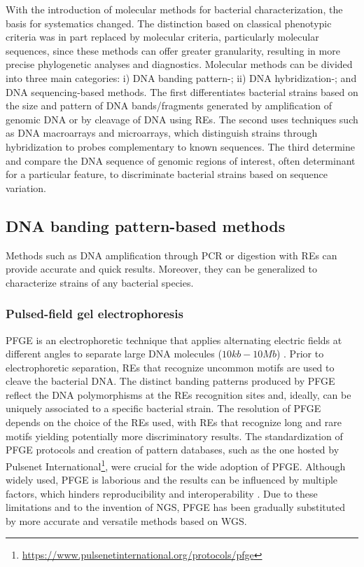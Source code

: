 With the introduction of molecular methods for bacterial characterization, the basis for systematics changed. The distinction based on classical phenotypic criteria was in part replaced by molecular criteria, particularly molecular sequences, since these methods can offer greater granularity, resulting in more precise phylogenetic analyses and diagnostics. Molecular methods can be divided into three main categories: i) \ac{DNA} banding pattern-; ii) \ac{DNA} hybridization-; and \ac{DNA} sequencing-based methods. The first differentiates bacterial strains based on the size and pattern of \ac{DNA} bands/fragments generated by amplification of genomic \ac{DNA} or by cleavage of \ac{DNA} using \ac{REs}. The second uses techniques such as \ac{DNA} macroarrays and microarrays, which distinguish strains through hybridization to probes complementary to known sequences. The third determine and compare the \ac{DNA} sequence of genomic regions of interest, often determinant for a particular feature, to discriminate bacterial strains based on sequence variation.

\subsection{DNA banding pattern-based methods}

Methods such as \ac{DNA} amplification through \ac{PCR} or digestion with \ac{REs} can provide accurate and quick results. Moreover, they can be generalized to characterize strains of any bacterial species.

\subsubsection{Pulsed-field gel electrophoresis}

\ac{PFGE} is an electrophoretic technique that applies alternating electric fields at different angles to separate large \ac{DNA} molecules ($10kb-10Mb$) \cite{schwartz_separation_1984, herschleb_pulsed-field_2007}. Prior to electrophoretic separation, \ac{REs} that recognize uncommon motifs are used to cleave the bacterial \ac{DNA}. The distinct banding patterns produced by \ac{PFGE} reflect the \ac{DNA} polymorphisms at the \ac{REs} recognition sites and, ideally, can be uniquely associated to a specific bacterial strain. The resolution of \ac{PFGE} depends on the choice of the \ac{REs} used, with \ac{REs} that recognize long and rare motifs yielding potentially more discriminatory results. The standardization of \ac{PFGE} protocols and creation of pattern databases, such as the one hosted by Pulsenet International\footnote{\url{https://www.pulsenetinternational.org/protocols/pfge}}, were crucial for the wide adoption of \ac{PFGE}. Although widely used, \ac{PFGE} is laborious and the results can be influenced by multiple factors, which hinders reproducibility and interoperability \cite{li_bacterial_2009}. Due to these limitations and to the invention of \ac{NGS}, \ac{PFGE} has been gradually substituted by more accurate and versatile methods based on \ac{WGS}.

